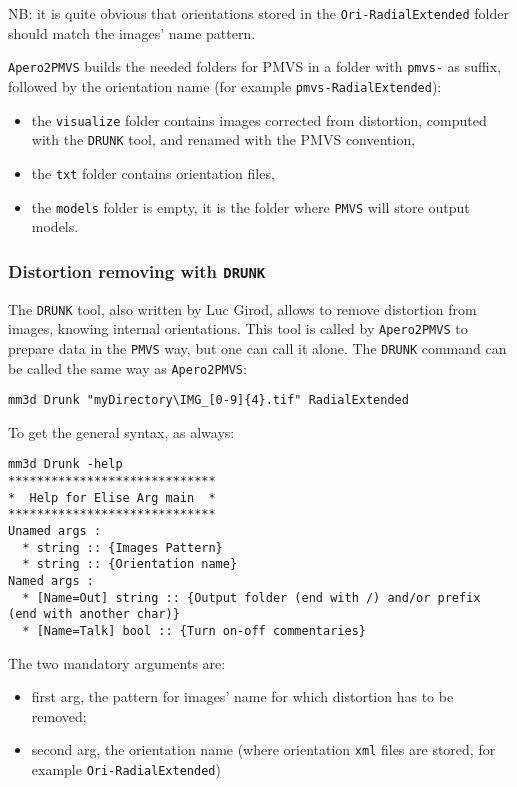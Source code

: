 \vspace{\baselineskip}
NB: it is quite obvious that orientations stored in the {\tt Ori-RadialExtended} folder should match the images' name pattern.

\vspace{\baselineskip}
{\tt Apero2PMVS} builds the needed folders for PMVS in a folder with {\tt pmvs-} as suffix, followed by the orientation name (for example {\tt pmvs-RadialExtended}):
\begin{itemize}
     \item the {\tt visualize} folder contains images corrected from distortion, computed with the {\tt DRUNK} tool, and renamed with the PMVS convention,
     \item the {\tt txt} folder contains orientation files,
     \item the {\tt models} folder is empty, it is the folder where {\tt PMVS} will store output models.
\end{itemize}

\subsubsection{Distortion removing with {\tt DRUNK} }

The {\tt DRUNK} tool, also written by Luc Girod, allows to remove distortion from images, knowing internal orientations. This tool is called by {\tt Apero2PMVS} to prepare data in the {\tt PMVS} way, but one can call it alone. The {\tt DRUNK} command can be called the same way as {\tt Apero2PMVS}:

\begin{verbatim}
mm3d Drunk "myDirectory\IMG_[0-9]{4}.tif" RadialExtended
\end{verbatim}

To get the general syntax, as always:

\begin{verbatim}
mm3d Drunk -help
*****************************
*  Help for Elise Arg main  *
*****************************
Unamed args :
  * string :: {Images Pattern}
  * string :: {Orientation name}
Named args :
  * [Name=Out] string :: {Output folder (end with /) and/or prefix (end with another char)}
  * [Name=Talk] bool :: {Turn on-off commentaries}
\end{verbatim}

The two mandatory arguments are:
\begin{itemize}
    \item first arg, the pattern for images' name for which distortion has to be removed;
    \item second arg, the orientation name (where orientation {\tt xml} files are stored, for example {\tt Ori-RadialExtended})
\end{itemize}


